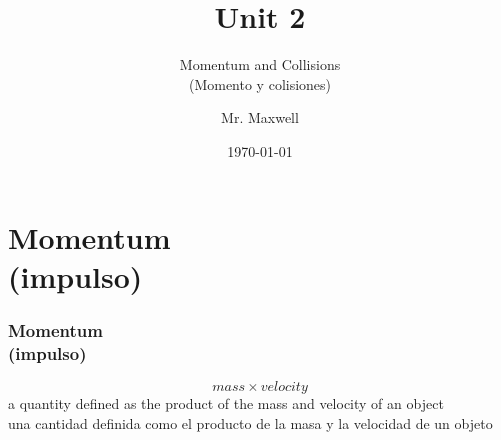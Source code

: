 \documentclass{beamer}
\title{Unit 2}
\subtitle{Momentum and Collisions\\(Momento y colisiones)}
\author{Mr. Maxwell}
\institute{PACS}
\date{\today}
\begin{document}
\frame{\titlepage}

\section{Momentum\\(impulso)}

\begin{frame}
    \frametitle{Momentum\\(impulso)}
$$ mass \times velocity $$
\pause a quantity defined as the product of the mass and velocity of an object\\
\alert{una cantidad definida como el producto de la masa y la velocidad de un objeto}
\end{frame}
\end{document}
